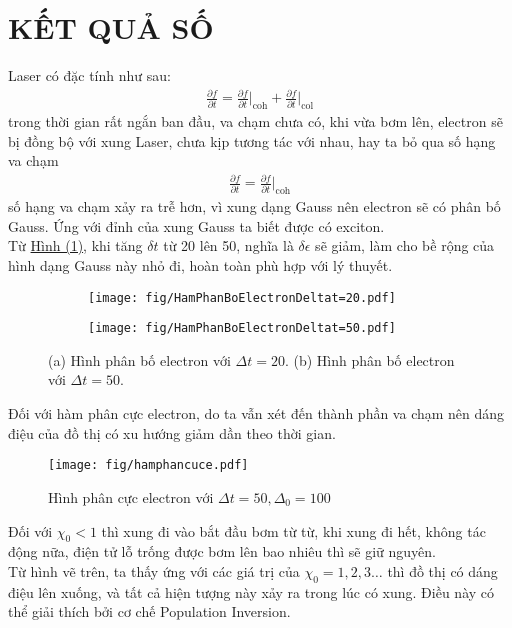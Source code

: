 \documentclass[%
 reprint,
 amsmath,amssymb,
 aps,
]{revtex4-2}
\newcommand{\at}[2]{\bigg\rvert_{#1}^{#2} }
\begin{document}
\section{\label{sec:level3} KẾT QUẢ SỐ}
Laser có đặc tính như sau:
\begin{equation}
	\begin{aligned}
		\frac{\partial f}{\partial t} = \frac{\partial f}{\partial t} \at{\text{coh}}{} +\frac{\partial f}{\partial t} \at{\text{col}}{}
	\end{aligned}
\end{equation}
trong thời gian rất ngắn ban đầu, va chạm chưa có, khi vừa bơm lên, electron sẽ bị đồng bộ với xung Laser, chưa kịp tương tác với nhau, hay ta bỏ qua số hạng va chạm 
\begin{equation}
	\begin{aligned}
		\frac{\partial f}{\partial t} = \frac{\partial f}{\partial t} \at{\text{coh}}{}
	\end{aligned}
\end{equation}
số hạng va chạm xảy ra trễ hơn, vì xung dạng Gauss nên electron sẽ có phân bố Gauss. Ứng với đỉnh của xung Gauss ta biết được có exciton.\\
\noindent Từ \hyperref[fig:distribution of e]{Hình (1)}, khi tăng $\delta t$ từ 20 lên 50, nghĩa là $\delta \epsilon$ sẽ giảm, làm cho bề rộng của hình dạng Gauss này nhỏ đi, hoàn toàn phù hợp với lý thuyết.
\begin{figure*}[ht]
	\centering
	\begin{subfigure}[b]{0.46\textwidth}
		\centering
		\texttt{[image: fig/HamPhanBoElectronDeltat=20.pdf]}
		\caption{}
		\label{fig:subfig1}
	\end{subfigure}
	\begin{subfigure}[b]{0.46\textwidth}
		\centering
		\texttt{[image: fig/HamPhanBoElectronDeltat=50.pdf]}
		\caption{}
		\label{fig:subfig2}
	\end{subfigure}
	\caption{
		(a) Hình phân bố electron với $\Delta t = 20$. 
		(b) Hình phân bố electron với $\Delta t = 50$. 
	}
	\label{fig:distribution of e}
\end{figure*}

\noindent Đối với hàm phân cực electron, do ta vẫn xét đến thành phần va chạm nên dáng điệu của đồ thị có xu hướng giảm dần theo thời gian.\\
\begin{figure*}[htb]
	\centering
	\texttt{[image: fig/hamphancuce.pdf]}
	\caption{Hình phân cực electron với $\Delta t = 50, \Delta_{0} = 100$}
	\label{fig:subfig3}
\end{figure*}
Đối với $\chi_0 < 1$ thì xung đi vào bắt đầu bơm từ từ, khi xung đi hết, không tác động nữa, điện tử lỗ trống được bơm lên bao nhiêu thì sẽ giữ nguyên.\\
Từ hình vẽ trên, ta thấy ứng với các giá trị của $\chi_0 = 1,2,3\ldots$ thì đồ thị có dáng điệu lên xuống, và tất cả hiện tượng này xảy ra trong lúc có xung. Điều này có thể giải thích bởi cơ chế Population Inversion.\\
\end{document}
